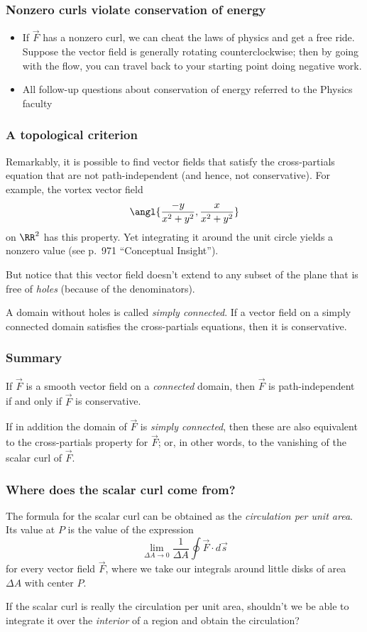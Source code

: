 \documentclass[11pt,ignorenonframetext,aspectratio=169,xcolor={svgnames}]{beamer}
\begin{document}
\begin{frame}\frametitle{Nonzero curls violate conservation of energy}

\begin{itemize}[<+->]
\itemsep1pt\parskip0pt
\item
  If $\vec{F}$ has a nonzero curl, we can cheat the laws of physics and
  get a free ride. Suppose the vector field is generally rotating
  counterclockwise; then by going with the flow, you can travel back to
  your starting point doing negative work.
\item
  All follow-up questions about conservation of energy referred to the
  Physics faculty
\end{itemize}

\end{frame}

\begin{frame}\frametitle{A topological criterion}

Remarkably, it is possible to find vector fields that satisfy the
cross-partials equation that are not path-independent (and hence, not
conservative). For example, the vortex vector field
\[ \angl{ \frac{-y}{x^2 + y^2}, \frac{x}{x^2 + y^2} } \] on $\RR^2$ has
this property. Yet integrating it around the unit circle yields a
nonzero value (see p.~971 ``Conceptual Insight'').

But notice that this vector field doesn't extend to any subset of the
plane that is free of \emph{holes} (because of the denominators).

A domain without holes is called \emph{simply connected}. If a vector
field on a simply connected domain satisfies the cross-partials
equations, then it is conservative.

\end{frame}

\begin{frame}\frametitle{Summary}

If $\vec{F}$ is a smooth vector field on a \emph{connected} domain, then
$\vec{F}$ is path-independent if and only if $\vec{F}$ is conservative.

If in addition the domain of $\vec{F}$ is \emph{simply connected}, then
these are also equivalent to the cross-partials property for $\vec{F}$;
or, in other words, to the vanishing of the scalar curl of $\vec{F}$.

\end{frame}

\begin{frame}\frametitle{Where does the scalar curl come from?}

The formula for the scalar curl can be obtained as the \emph{circulation
per unit area}. Its value at $P$ is the value of the expression
\[ \lim_{\Delta A \to 0} \frac{1}{\Delta A} \oint \vec{F} \cdot d\vec{s} \]
for every vector field $\vec{F}$, where we take our integrals around
little disks of area $\Delta A$ with center $P$.

If the scalar curl is really the circulation per unit area, shouldn't we
be able to integrate it over the \emph{interior} of a region and obtain
the circulation?

\end{frame}
\end{document}
